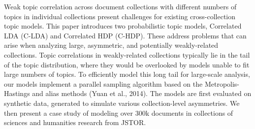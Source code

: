 Weak topic correlation across document collections with different numbers of topics in individual collections present challenges for existing cross-collection topic models. This paper introduces two probabilistic topic models, Correlated LDA (C-LDA) and Correlated HDP (C-HDP). These address problems that can arise when analyzing large, asymmetric, and potentially weakly-related collections. Topic correlations in weakly-related collections typically lie in the tail of the topic distribution, where they would be overlooked by models unable to fit large numbers of topics. To efficiently model this long tail for large-scale analysis, our models implement a parallel sampling algorithm based on the Metropolis-Hastings and alias methods (Yuan et al., 2014). The models are first evaluated on synthetic data, generated to simulate various collection-level asymmetries. We then present a case study of modeling over 300k documents in collections of sciences and humanities research from JSTOR.
